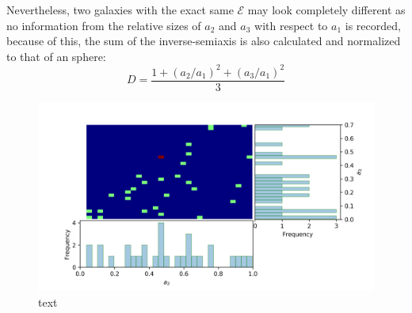 	\pagebreak
	Nevertheless, two galaxies with the exact same $\mathcal{E}$ may look completely different as no information from the relative sizes of $a_2$ and $a_3$ with respect to $a_1$ is recorded, because of this, the sum of the inverse-semiaxis is also calculated and normalized to that of an sphere:
	\begin{equation}
		D = \dfrac{1 + (a_2/a_1)^2 + (a_3/a_1)^2}{3}
	\end{equation}
	
	\begin{figure}[h]
		\centering
		\includegraphics[width = 0.9\linewidth]{"../Files/Week 13/triaxial_axes"}
		\caption{text}
		\label{fig: semiaxisDist}
	\end{figure}
	
